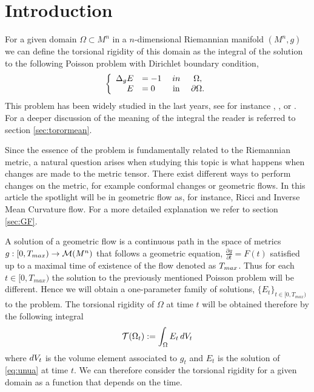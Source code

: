 \documentclass{amsart}
\theoremstyle{definition}
\theoremstyle{remark}
\begin{document}
\section{Introduction}\label{sec:intro}
For a given domain $\Omega\subset M^n$ in a $n$-dimensional Riemannian manifold $(M^n,g)$ we can define the torsional rigidity of this domain as the integral of the solution to the following Poisson problem with Dirichlet boundary condition, 
\begin{equation}\label{eq:unua}
    \left\lbrace
\begin{array}{rlcc}
\Delta_g E&=-1& {\rm in }& \Omega,\\
    {E}&=0&\text{ \rm in } &\partial\Omega.
\end{array}
\right.
\end{equation}
This problem has been widely studied in the last years, see for instance  \cite{mcdonald}, \cite{Grigoryan},\cite{MARKVORSEN_PALMER_2006} or \cite{erick}. 
For a deeper discussion of the meaning of the integral the reader is referred to section \ref{sec:torormean}. 

Since the essence of the problem is fundamentally related to the Riemannian metric, a natural question arises when studying this topic is what happens when changes  are made  to the metric tensor. There exist different ways to perform changes on the metric, for example conformal changes or geometric flows. In this article the spotlight will be  in geometric flow as, for instance,  Ricci and Inverse Mean Curvature flow. For a more detailed explanation we refer to section \ref{sec:GF}.

A  solution of a geometric flow is a continuous path in the space of metrics $g:[0,T_{\rm max})\to \mathcal{M}(M^n)$ that  follows a geometric equation, $\frac{\partial g}{\partial t}= F(t)$ satisfied up to a maximal time of existence of the flow denoted as $T_{\rm max}$. Thus for each $t\in [0,T_{max})$ the solution to the previously mentioned Poisson problem will be different. Hence we will obtain  a one-parameter family of solutions, $\{ E_t\}_{t\in [0,T_{max})}$ to the problem. The torsional rigidity of $\Omega$ at time $t$ will be obtained therefore by  the following integral
\begin{equation*}
   \mathcal{T}(\Omega_t):=\int_\Omega E_t\, d{\rm V}_t  
\end{equation*}
where $d{\rm V}_t$ is the volume element associated to $g_t$ and $E_t$ is the solution of \eqref{eq:unua} at time $t$. We can therefore  consider the torsional rigidity for a given domain as a function that depends on the time. 
\end{document}

